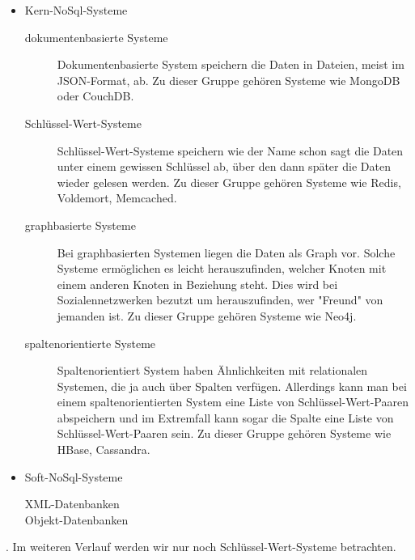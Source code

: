 \begin{itemize}
\item Kern-NoSql-Systeme
\begin{description}
\item[dokumentenbasierte Systeme] Dokumentenbasierte System speichern die Daten
in Dateien, meist im JSON-Format, ab. Zu dieser Gruppe gehören Systeme wie
MongoDB oder CouchDB.
\item[Schlüssel-Wert-Systeme] Schlüssel-Wert-Systeme speichern wie der Name schon
sagt die Daten unter einem gewissen Schlüssel ab, über den dann später die Daten
wieder gelesen werden. Zu dieser Gruppe gehören Systeme wie Redis, Voldemort,
Memcached.
\item[graphbasierte Systeme] Bei graphbasierten Systemen liegen die Daten als
Graph vor. Solche Systeme ermöglichen es leicht herauszufinden, welcher Knoten
mit einem anderen Knoten in Beziehung steht. Dies wird bei Sozialennetzwerken
bezutzt um herauszufinden, wer "Freund" von jemanden ist. Zu dieser Gruppe
gehören Systeme wie Neo4j.
\item[spaltenorientierte Systeme] Spaltenorientiert System haben Ähnlichkeiten
mit relationalen Systemen, die ja auch über Spalten verfügen. Allerdings kann man
bei einem spaltenorientierten System eine Liste von Schlüssel-Wert-Paaren
abspeichern und im Extremfall kann sogar die Spalte eine Liste von
Schlüssel-Wert-Paaren sein. Zu dieser Gruppe gehören Systeme wie HBase, Cassandra.
\end{description}
\item Soft-NoSql-Systeme
\begin{description}
\item[XML-Datenbanken]
\item[Objekt-Datenbanken]
\end{description}
\end{itemize}

. Im weiteren Verlauf werden wir nur noch Schlüssel-Wert-Systeme betrachten.
